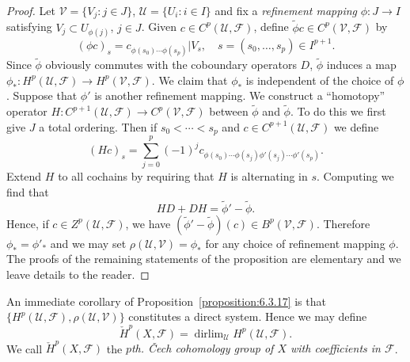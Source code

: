\begin{proof}
Let $\mathcal V=\{V_j:j\in J\}$, $\mathcal U=\{U_i:i\in I\}$ and fix a \emph{refinement mapping} $\phi:J\to I$ satisfying $V_j\subset U_{\phi(j)}$, $j\in J$. Given $c\in C^p(\mathcal U,\mathcal F)$, define $\widetilde\phi c\in C^p(\mathcal V,\mathcal F)$ by
\[
(\phi c)_s=c_{\phi(s_0)\cdots\phi(s_p)}|V_s,\quad s=(s_0,\ldots,s_p)\in I^{p+1}.
\]
Since $\widetilde\phi$ obviously commutes with the coboundary operators $D$, $\widetilde\phi$ induces a map $\phi_*:H^p(\mathcal U,\mathcal F)\to H^p(\mathcal V,\mathcal F)$. We claim that $\phi_*$ is independent of the choice of $\phi$. Suppose that $\phi'$ is another refinement mapping. We construct a ``homotopy'' operator $H:C^{p+1}(\mathcal U,\mathcal F)\to C^p(\mathcal V,\mathcal F)$ between $\widetilde\phi$ and $\widetilde\phi$. To do this we first give $J$ a total ordering. Then if $s_0<\cdots<s_p$ and $c\in C^{p+1}(\mathcal U,\mathcal F)$ we define
\[
(Hc)_s=\sum_{j=0}^p(-1)^j c_{\phi(s_0)\cdots\phi(s_j)\phi'(s_j)\cdots\phi'(s_p)}.
\]
Extend $H$ to all cochains by requiring that $H$ is alternating in $s$. Computing we find that
\[
HD+DH=\widetilde\phi'-\widetilde\phi.
\]
Hence, if $c\in Z^p(\mathcal U,\mathcal F)$, we have $(\widetilde\phi'-\widetilde\phi)(c)\in B^p(\mathcal V,\mathcal F)$. Therefore $\phi_*=\phi'_*$ and we may set $\rho(\mathcal U,\mathcal V)=\phi_*$ for any choice of refinement mapping $\phi$. The proofs of the remaining statements of the proposition are elementary and we leave details to the reader.
\end{proof}
An immediate corollary of Proposition~\ref{proposition:6.3.17} is that $\{H^p(\mathcal U,\mathcal F),\rho(\mathcal U,\mathcal V)\}$ constitutes a direct system. Hence we may define
\[
\check H^p(X,\mathcal F)=\operatorname{dirlim}_{\mathcal U}H^p(\mathcal U,\mathcal F).
\]
We call $\check H^p(X,\mathcal F)$ the \emph{$p$th. \v{C}ech cohomology group of $X$ with coefficients in $\mathcal F$}.

